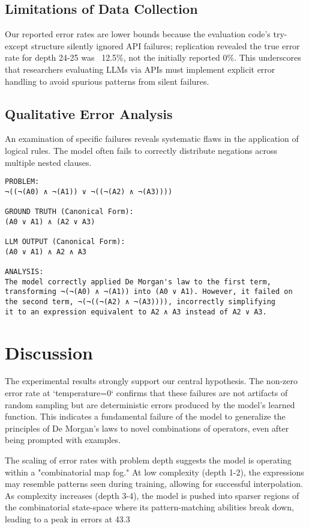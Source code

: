 \documentclass[11pt,a4paper]{article}
\begin{document}
\subsection{Limitations of Data Collection}
Our reported error rates are lower bounds because the evaluation code's try-except structure silently ignored API failures; replication revealed the true error rate for depth 24-25 was ~12.5\%, not the initially reported 0\%. This underscores that researchers evaluating LLMs via APIs must implement explicit error handling to avoid spurious patterns from silent failures.

\subsection{Qualitative Error Analysis}
An examination of specific failures reveals systematic flaws in the application of logical rules. The model often fails to correctly distribute negations across multiple nested clauses.

\begin{verbatim}
PROBLEM:
¬((¬(A0) ∧ ¬(A1)) ∨ ¬((¬(A2) ∧ ¬(A3))))

GROUND TRUTH (Canonical Form):
(A0 ∨ A1) ∧ (A2 ∨ A3)

LLM OUTPUT (Canonical Form):
(A0 ∨ A1) ∧ A2 ∧ A3

ANALYSIS:
The model correctly applied De Morgan's law to the first term,
transforming ¬(¬(A0) ∧ ¬(A1)) into (A0 ∨ A1). However, it failed on 
the second term, ¬(¬((¬(A2) ∧ ¬(A3)))), incorrectly simplifying 
it to an expression equivalent to A2 ∧ A3 instead of A2 ∨ A3.
\end{verbatim}

\section{Discussion}
The experimental results strongly support our central hypothesis. The non-zero error rate at `temperature=0` confirms that these failures are not artifacts of random sampling but are deterministic errors produced by the model's learned function. This indicates a fundamental failure of the model to generalize the principles of De Morgan's laws to novel combinations of operators, even after being prompted with examples.

The scaling of error rates with problem depth suggests the model is operating within a "combinatorial map fog." At low complexity (depth 1-2), the expressions may resemble patterns seen during training, allowing for successful interpolation. As complexity increases (depth 3-4), the model is pushed into sparser regions of the combinatorial state-space where its pattern-matching abilities break down, leading to a peak in errors at 43.3%
 
\end{document}
